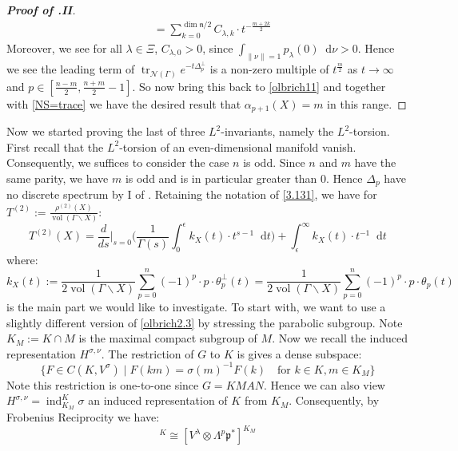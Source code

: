 \documentclass[11pt]{report}
\theoremstyle{definition}
\theoremstyle{plain}
\DeclareMathOperator{\tr}{tr}
\DeclareMathOperator{\ind}{ind}
\DeclareMathOperator{\vol}{vol}
\newcommand{\vna}{\mathcal{N}}
\newcommand{\norm}[1]{\lVert #1 \rVert}
\newcommand{\mass}[1]{\mathop{}\mathrm{d}{#1}}
\newcommand{\Lie}[1]{\mathfrak{#1}}
\begin{document}
\begin{proof}[\textbf{Proof of .II}]
\begin{equation*}
\begin{split}
&=\sum_{k=0}^{\dim\Lie{n}/2}C_{\lambda, k}\cdot t^{-\frac{m+2k}{2}}
\end{split}
\end{equation*}
Moreover, we see for all $\lambda\in \Xi$, $C_{\lambda, 0}>0$, since $\int_{\norm{\nu}=1}^{}p_{\lambda}(0)\mass{\nu}>0$. Hence we see the leading term of $\tr_{\vna(\Gamma)}e^{-t\Delta^\perp_p}$ is a non-zero multiple of $t^{\frac{m}{2}}$ as $t\to \infty$ and $p\in [\frac{n-m}{2}, \frac{n+m}{2}-1]$. So now bring this back to \ref{olbrich11} and together with \ref{NS=trace} we have the desired result that $\alpha_{p+1}(X)=m$ in this range.
\end{proof}

Now we started proving the last of three $L^2$-invariants, namely the $L^2$-torsion. First recall  that the $L^2$-torsion of an even-dimensional manifold vanish. Consequently, we suffices to consider the case $n$ is odd. Since $n$ and $m$ have the same parity, we have $m$ is odd and is in particular greater than $0$. Hence $\Delta_p$ have no discrete spectrum by I of . Retaining the notation of \ref{3.131}, we have for $T^{(2)}:=\frac{\rho^{(2)}(X)}{\vol(\Gamma\backslash X)}$:
\begin{equation}\label{olrbichtorsion}
T^{(2)}(X)=\frac{d}{ds}\Big|_{s=0}\Big(\frac{1}{\Gamma(s)}\int_{0}^{\epsilon}k_X(t)\cdot t^{s-1}\mass{t}\Big)+\int_{\epsilon}^{\infty}k_X(t)\cdot t^{-1}\mass{t}
\end{equation}
where:
\begin{equation}
k_X(t):=\frac{1}{2\vol(\Gamma\backslash X)}\sum_{p =0}^n(-1)^p\cdot p\cdot \theta_p^\perp(t)=\frac{1}{2\vol(\Gamma\backslash X)}\sum_{p =0}^n(-1)^p\cdot p\cdot \theta_p(t) 
\end{equation}
is the main part we would like to investigate. To start with, we want to use a slightly different version of \ref{olbrich2.3} by stressing the parabolic subgroup. Note $K_M:=K\cap M$ is the maximal compact subgroup of $M$. Now we recall the induced representation $H^{\sigma, \nu}$. The restriction of $G$ to $K$ is gives a dense subspace:
\begin{equation}
\{F\in C(K, V^\sigma)\mid F(km)=\sigma(m)^{-1}F(k) \quad \text{for }k\in K, m\in K_M \}
\end{equation}
Note this restriction is one-to-one since $G=KMAN$. Hence we can also view $H^{\sigma,\nu}=\ind^K_{K_M}\sigma$ an induced representation of $K$ from $K_M$. Consequently, by Frobenius Reciprocity we have:
\begin{equation}
[H^{\lambda, i\nu}\otimes \Lambda^p\Lie{p}^*]^K\cong [V^\lambda\otimes \Lambda^p\Lie{p}^*]^{K_M}
\end{equation}
\end{document}
